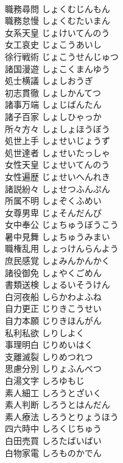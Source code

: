 \documentclass[8pt]{extreport}
\begin{document}
\begin{CJK}{UTF8}{min}
\\	職務尋問	しょくむじんもん	
\\	職務怠慢	しょくむたいまん	
\\	女系天皇	じょけいてんのう	
\\	女工哀史	じょこうあいし	
\\	徐行戦術	じょこうせんじゅつ	
\\	諸国漫遊	しょこくまんゆう	
\\	処士横議	しょしおうぎ	
\\	初志貫徹	しょしかんてつ	
\\	諸事万端	しょじばんたん	
\\	諸子百家	しょしひゃっか	
\\	所々方々	しょしょほうぼう	
\\	処世上手	しょせいじょうず	
\\	処世達者	しょせいたっしゃ	
\\	女性天皇	じょせいてんのう	
\\	女性遍歴	じょせいへんれき	
\\	諸説紛々	しょせつふんぷん	
\\	所属不明	しょぞくふめい	
\\	女尊男卑	じょそんだんぴ	
\\	女中奉公	じょちゅうぼうこう	
\\	暑中見舞	しょちゅうみまい	
\\	職権乱用	しょっけんらんよう	
\\	庶民感覚	しょみんかんかく	
\\	諸役御免	しょやくごめん	
\\	書類送検	しょるいそうけん	
\\	白河夜船	しらかわよふね	
\\	自力更正	じりきこうせい	
\\	自力本願	じりきほんがん	
\\	私利私欲	しりしよく	
\\	事理明白	じりめいはく	
\\	支離滅裂	しりめつれつ	
\\	思慮分別	しりょふんべつ	
\\	白湯文字	しろゆもじ	
\\	素人細工	しろうとざいく	
\\	素人判断	しろうとはんだん	
\\	素人療法	しろうとりょうほう	
\\	四六時中	しろくじちゅう	
\\	白田売買	しろたばいばい	
\\	白物家電	しろものかでん	

\end{CJK}
\end{document}
